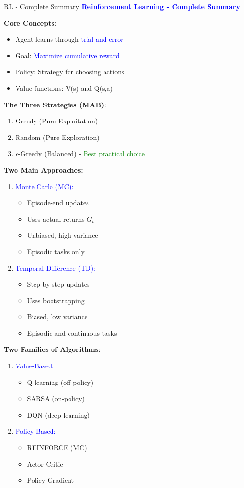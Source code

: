 \documentclass[8pt]{beamer}
\begin{document}
\begin{frame}{RL - Complete Summary}
\fontsize{6.5}{7.5}\selectfont
\textcolor{blue}{\textbf{Reinforcement Learning - Complete Summary}}

\textbf{Core Concepts:}
\begin{itemize}
\item Agent learns through \textcolor{blue}{trial and error}
\item Goal: \textcolor{blue}{Maximize cumulative reward}
\item Policy: Strategy for choosing actions
\item Value functions: V(s) and Q(s,a)
\end{itemize}

\textbf{The Three Strategies (MAB):}
\begin{enumerate}
\item Greedy (Pure Exploitation)
\item Random (Pure Exploration)
\item $\epsilon$-Greedy (Balanced) - \textcolor{green}{Best practical choice}
\end{enumerate}

\textbf{Two Main Approaches:}
\begin{enumerate}
\item \textcolor{blue}{Monte Carlo (MC):}
\begin{itemize}
\item Episode-end updates
\item Uses actual returns $G_t$
\item Unbiased, high variance
\item Episodic tasks only
\end{itemize}
\item \textcolor{blue}{Temporal Difference (TD):}
\begin{itemize}
\item Step-by-step updates
\item Uses bootstrapping
\item Biased, low variance
\item Episodic and continuous tasks
\end{itemize}
\end{enumerate}

\textbf{Two Families of Algorithms:}
\begin{enumerate}
\item \textcolor{blue}{Value-Based:}
\begin{itemize}
\item Q-learning (off-policy)
\item SARSA (on-policy)
\item DQN (deep learning)
\end{itemize}
\item \textcolor{blue}{Policy-Based:}
\begin{itemize}
\item REINFORCE (MC)
\item Actor-Critic
\item Policy Gradient
\end{itemize}
\end{enumerate}


\end{frame}
\end{document}
